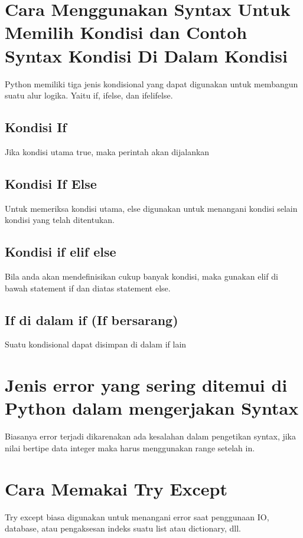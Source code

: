 \documentclass{article}
\begin{document}
\section{Cara Menggunakan Syntax Untuk Memilih Kondisi dan Contoh Syntax Kondisi Di Dalam Kondisi}
Python memiliki tiga jenis kondisional yang dapat digunakan untuk membangun suatu alur logika. Yaitu if, ifelse, dan ifelifelse.
\subsection{Kondisi If}
Jika kondisi utama true, maka perintah akan dijalankan
\subsection{Kondisi If Else}
Untuk memeriksa kondisi utama, else digunakan untuk menangani kondisi selain kondisi yang telah ditentukan.
\subsection{Kondisi if elif else}
Bila anda akan mendeﬁnisikan cukup banyak kondisi, maka gunakan elif di bawah statement if dan diatas statement else.
\subsection{If di dalam if (If bersarang)}
Suatu kondisional dapat disimpan di dalam if lain
\section{Jenis error yang sering ditemui di Python dalam mengerjakan Syntax }
Biasanya error terjadi dikarenakan ada kesalahan dalam pengetikan syntax, jika nilai bertipe data integer maka harus menggunakan range setelah in.
\section{Cara Memakai Try Except}
Try except biasa digunakan untuk menangani error saat penggunaan IO, database, atau pengaksesan indeks suatu list atau dictionary, dll.
\end{document}
